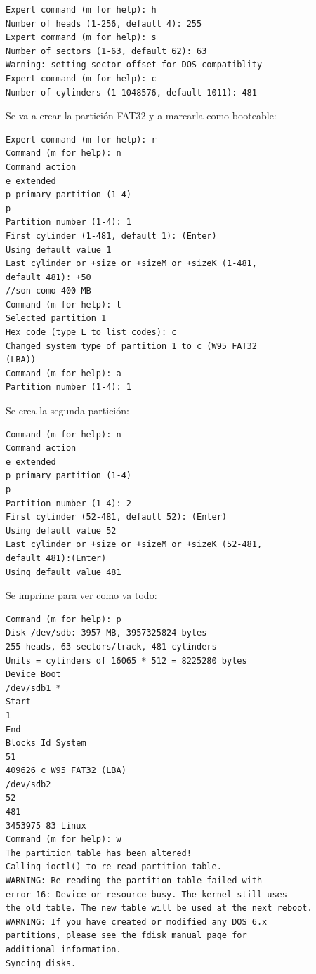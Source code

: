 \begin{verbatim}
Expert command (m for help): h 
Number of heads (1-256, default 4): 255 
Expert command (m for help): s 
Number of sectors (1-63, default 62): 63 
Warning: setting sector offset for DOS compatiblity 
Expert command (m for help): c 
Number of cylinders (1-1048576, default 1011): 481 
\end{verbatim}


Se va a crear la partición FAT32 y a marcarla como booteable: 

\begin{verbatim}
Expert command (m for help): r 
Command (m for help): n 
Command action 
e extended 
p primary partition (1-4) 
p 
Partition number (1-4): 1 
First cylinder (1-481, default 1): (Enter) 
Using default value 1 
Last cylinder or +size or +sizeM or +sizeK (1-481, 
default 481): +50 
//son como 400 MB 
Command (m for help): t 
Selected partition 1 
Hex code (type L to list codes): c 
Changed system type of partition 1 to c (W95 FAT32 
(LBA)) 
Command (m for help): a 
Partition number (1-4): 1 
\end{verbatim}

\newpage
Se crea la segunda partición: 

\begin{verbatim}
Command (m for help): n 
Command action 
e extended 
p primary partition (1-4) 
p 
Partition number (1-4): 2 
First cylinder (52-481, default 52): (Enter) 
Using default value 52 
Last cylinder or +size or +sizeM or +sizeK (52-481, 
default 481):(Enter) 
Using default value 481 
\end{verbatim}

Se imprime para ver como va todo: 

\begin{verbatim}
Command (m for help): p 
Disk /dev/sdb: 3957 MB, 3957325824 bytes 
255 heads, 63 sectors/track, 481 cylinders 
Units = cylinders of 16065 * 512 = 8225280 bytes 
Device Boot 
/dev/sdb1 * 
Start 
1 
End 
Blocks Id System 
51 
409626 c W95 FAT32 (LBA) 
/dev/sdb2 
52 
481 
3453975 83 Linux 
Command (m for help): w 
The partition table has been altered! 
Calling ioctl() to re-read partition table. 
WARNING: Re-reading the partition table failed with 
error 16: Device or resource busy. The kernel still uses 
the old table. The new table will be used at the next reboot. 
WARNING: If you have created or modified any DOS 6.x 
partitions, please see the fdisk manual page for 
additional information. 
Syncing disks. 
\end{verbatim}

